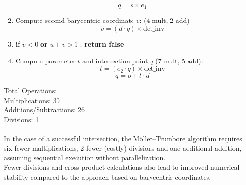 \documentclass{article}
\begin{document}
\begin{enumerate}
    \begin{equation*}
        q = s \times e_1
    \end{equation*}
    \item Compute second barycentric coordinate  $v$:  (4 mult, 2 add)
        \begin{equation*}
            v = (d \cdot q) \times \text{det\_inv}
        \end{equation*}
    \item \textbf{if } $v < 0$ \textbf{or} $u+v > 1$ : \textbf{return false}
    \item Compute parameter $t$ and intersection point $q$ (7 mult, 5 add):
        \begin{equation*}
            t = (e_2 \cdot q) \times \text{det\_inv}
        \end{equation*}
        \begin{equation*}
                q = o + t \cdot d
        \end{equation*}
\end{enumerate}

Total Operations: \\
Multiplications: 30\\
Additions/Subtractions: 26\\
Divisions: 1\\
\\
In the case of a successful intersection, the Möller–Trumbore algorithm requires six fewer multiplications, 2 fewer (costly) divisions and one additional addition, assuming sequential execution without parallelization.\\
Fewer divisions and cross product calculations also lead to improved numerical stability compared to the approach based on barycentric coordinates.
\end{document}
